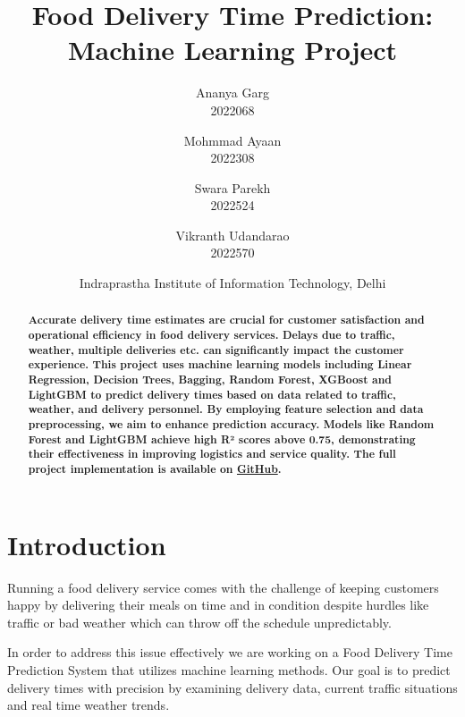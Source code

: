\documentclass[10pt,twocolumn,letterpaper]{article}
\begin{document}
\title{Food Delivery Time Prediction: Machine Learning Project}

\author{
Ananya Garg \\ \small2022068
\and Mohmmad Ayaan \\ \small2022308
\and Swara Parekh \\ \small2022524
\and Vikranth Udandarao \\ \small2022570
\and Indraprastha Institute of Information Technology, Delhi
}

\maketitle

\begin{abstract}
    \textbf{Accurate delivery time estimates are crucial for customer satisfaction and operational efficiency in food delivery services. Delays due to traffic, weather, multiple deliveries etc. can significantly impact the customer experience. This project uses machine learning models including Linear Regression, Decision Trees, Bagging, Random Forest, XGBoost and LightGBM to predict delivery times based on data related to traffic, weather, and delivery personnel. By employing feature selection and data preprocessing, we aim to enhance prediction accuracy. Models like Random Forest and LightGBM achieve high R² scores above 0.75, demonstrating their effectiveness in improving logistics and service quality. The full project implementation is available on \href{https://github.com/Vikranth3140/Food-Delivery-Time-Prediction}{GitHub}.}
\end{abstract}

\section{Introduction}
Running a food delivery service comes with the challenge of keeping customers happy by delivering their meals on time and in condition despite hurdles like traffic or bad weather which can throw off the schedule unpredictably.

In order to address this issue effectively we are working on a Food Delivery Time Prediction System that utilizes machine learning methods. Our goal is to predict delivery times with precision by examining delivery data, current traffic situations and real time weather trends.

\end{document}
